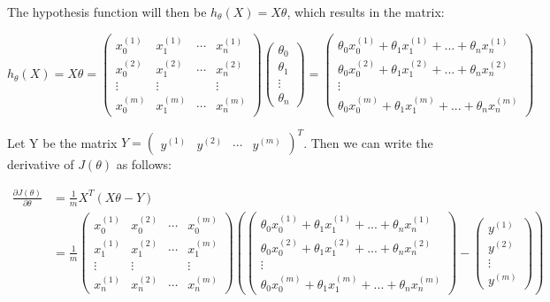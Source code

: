 \documentclass{article}
\begin{document}
	The hypothesis function will then be $h_\theta(X) = X \theta$, which results in the matrix:
	
	\begin{equation*}
	h_\theta(X) = X \theta =  \begin{pmatrix} 
		x_0^{(1)} & x_1^{(1)} & \cdots & x_n^{(1)} \\
		x_0^{(2)} & x_1^{(2)} & \cdots & x_n^{(2)} \\
		\vdots & \vdots & & \vdots \\
		x_0^{(m)} & x_1^{(m)} & \cdots & x_n^{(m)}
	     \end{pmatrix}
	\begin{pmatrix}
	\theta_0 \\
	\theta_1 \\
	\vdots \\
	\theta_n
	\end{pmatrix}
	 = \begin{pmatrix}
	\theta_0 x_0^{(1)} + \theta_1 x_1^{(1)}+  ... + \theta_n x_n^{(1)} \\
	\theta_0 x_0^{(2)} + \theta_1 x_1^{(2)}+  ... + \theta_n x_n^{(2)}\\
	\vdots \\
	\theta_0 x_0^{(m)} + \theta_1 x_1^{(m)}+ ... + \theta_n x_n^{(m)}
	\end{pmatrix}
	\end{equation*}
	
\pagebreak

	Let Y be the matrix $Y = \begin{pmatrix} y^{(1)} & y^{(2)} & \cdots & y^{(m)} \end{pmatrix} ^T$. Then we can write the derivative of $J(\theta)$ as follows:
	
	\begin{align*}
	\frac{\partial J(\theta)}{\partial \theta} &= \frac{1}{m} X^T(X\theta - Y) \\
	&= \frac{1}{m}\begin{pmatrix} 
		x_0^{(1)} & x_0^{(2)} & \cdots & x_0^{(m)} \\
		x_1^{(1)} & x_1^{(2)} & \cdots & x_1^{(m)} \\
		\vdots & \vdots & & \vdots \\
		x_n^{(1)} & x_n^{(2)} & \cdots & x_n^{(m)}
	     \end{pmatrix}
	\left( 
	 \begin{pmatrix}
	\theta_0 x_0^{(1)} + \theta_1 x_1^{(1)}+  ... + \theta_n x_n^{(1)} \\
	\theta_0 x_0^{(2)} + \theta_1 x_1^{(2)}+  ... + \theta_n x_n^{(2)}\\
	\vdots \\
	\theta_0 x_0^{(m)} + \theta_1 x_1^{(m)}+ ... + \theta_n x_n^{(m)}
	\end{pmatrix}
	- \begin{pmatrix} y^{(1)} \\ y^{(2)} \\ \vdots \\ y^{(m)} \end{pmatrix}
	\right)
	\end{align*}
	
\end{document}
